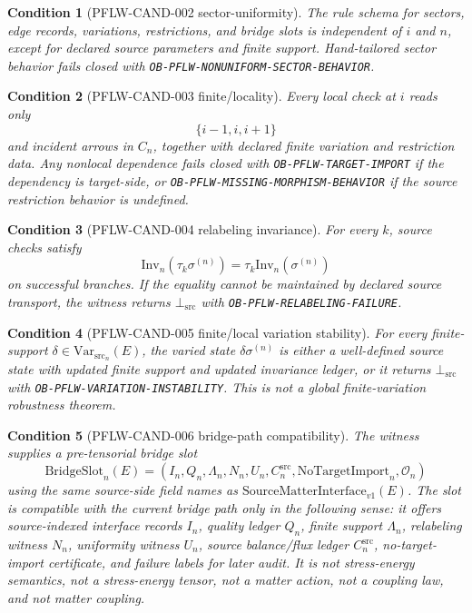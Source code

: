 \documentclass[11pt]{article}
\newcommand{\SMI}{\mathrm{SourceMatterInterface}_{v1}}
\newcommand{\VarSrc}{\mathrm{Var}_{\mathrm{src}}}
\newcommand{\NoTargetImport}{\mathrm{NoTargetImport}}
\newcommand{\Inv}{\mathrm{Inv}}
\newcommand{\BottomSrc}{\bot_{\mathrm{src}}}
\newcommand{\BridgeSlot}{\mathrm{BridgeSlot}}
\newtheorem{condition}{Condition}
\begin{document}
\begin{condition}[PFLW-CAND-002 sector-uniformity]
The rule schema for sectors, edge records, variations, restrictions, and
bridge slots is independent of \(i\) and \(n\), except for declared source
parameters and finite support. Hand-tailored sector behavior fails closed with
\texttt{OB-PFLW-NONUNIFORM-SECTOR-BEHAVIOR}.
\end{condition}

\begin{condition}[PFLW-CAND-003 finite/locality]
Every local check at \(i\) reads only
\[
  \{i-1,i,i+1\}
\]
and incident arrows in \(C_n\), together with declared finite variation and
restriction data. Any nonlocal dependence fails closed with
\texttt{OB-PFLW-TARGET-IMPORT} if the dependency is target-side, or
\texttt{OB-PFLW-MISSING-MORPHISM-BEHAVIOR} if the source restriction behavior
is undefined.
\end{condition}

\begin{condition}[PFLW-CAND-004 relabeling invariance]
For every \(k\), source checks satisfy
\[
  \Inv_n(\tau_k\sigma^{(n)})=\tau_k\Inv_n(\sigma^{(n)})
\]
on successful branches. If the equality cannot be maintained by declared
source transport, the witness returns \(\BottomSrc\) with
\texttt{OB-PFLW-RELABELING-FAILURE}.
\end{condition}

\begin{condition}[PFLW-CAND-005 finite/local variation stability]
For every finite-support \(\delta\in\VarSrc_n(E)\), the varied state
\(\delta\sigma^{(n)}\) is either a well-defined source state with updated
finite support and updated invariance ledger, or it returns \(\BottomSrc\)
with \texttt{OB-PFLW-VARIATION-INSTABILITY}. This is not a global
finite-variation robustness theorem.
\end{condition}

\begin{condition}[PFLW-CAND-006 bridge-path compatibility]
The witness supplies a pre-tensorial bridge slot
\[
  \BridgeSlot_n(E)=(I_n,Q_n,\Lambda_n,N_n,U_n,C_n^{\mathrm{src}},
  \NoTargetImport_n,\mathcal{O}_n)
\]
using the same source-side field names as \(\SMI(E)\). The slot is
compatible with the current bridge path only in the following sense: it offers
source-indexed interface records \(I_n\), quality ledger \(Q_n\), finite
support \(\Lambda_n\), relabeling witness \(N_n\), uniformity witness \(U_n\),
source balance/flux ledger \(C_n^{\mathrm{src}}\), no-target-import
certificate, and failure labels for later audit. It is not stress-energy
semantics, not a stress-energy tensor, not a matter action, not a coupling
law, and not matter coupling.
\end{condition}
\end{document}
